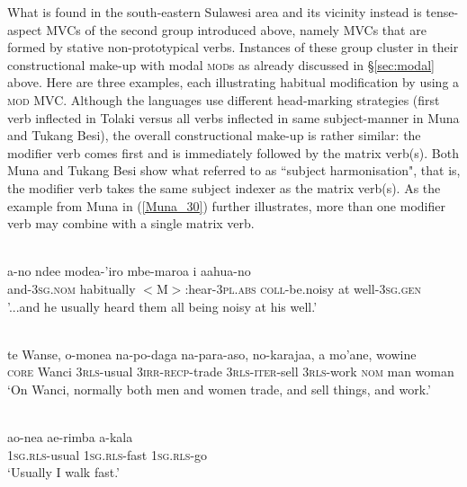 What is found in the south-eastern Sulawesi area and its vicinity instead is tense-aspect MVCs of the second group introduced above, namely MVCs that are formed by stative non-prototypical verbs. Instances of these group cluster in their constructional make-up with modal \textsc{mod}s as already discussed in §\ref{sec:modal} above. Here are three examples, each illustrating habitual modification by using a \textsc{mod} MVC. Although the languages use different head-marking strategies (first verb inflected in Tolaki versus all verbs inflected in same subject-manner in Muna and Tukang Besi), the overall constructional make-up is rather similar: the modifier verb comes first and is immediately followed by the matrix verb(s). Both Muna and Tukang Besi show what \citet{vandenberg1989} referred to as ``subject harmonisation", that is, the modifier verb takes the same subject indexer as the matrix verb(s). As the example from Muna in (\ref{Muna_30}) further illustrates, more than one modifier verb may combine with a single matrix verb.

\ea \label{Tolaki_39}
\\
\gll a-no ndee modea-'iro mbe-maroa i aahua-no\\
and-3\textsc{sg}.\textsc{nom} habitually $<$M$>$:hear-3\textsc{pl}.\textsc{abs} \textsc{coll}-be.noisy at well-3\textsc{sg}.\textsc{gen}\\
\glft '...and he usually heard them all being noisy at his well.'\\
\z

\ea \label{Tukang_62}
\\
\gll te Wanse, o-monea na-po-daga na-para-aso, no-karajaa, a mo'ane, wowine \\
\textsc{core} Wanci 3\textsc{rls}-usual 3\textsc{irr}-\textsc{recp}-trade 3\textsc{rls}-\textsc{iter}-sell 3\textsc{rls}-work \textsc{nom} man woman \\
\glft `On Wanci, normally both men and women trade, and sell things, and work.' \\ 
\z

\ea \label{Muna_30}
\\
\gll ao-nea ae-rimba a-kala \\
1\textsc{sg}.\textsc{rls}-usual 1\textsc{sg}.\textsc{rls}-fast 1\textsc{sg}.\textsc{rls}-go \\
\glft `Usually I walk fast.'\\ 
\z


